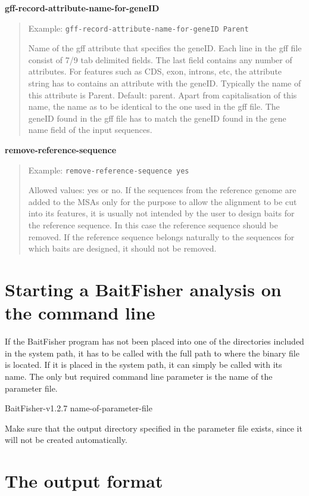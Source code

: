 \documentclass[a4paper,pdflatex,11pt]{article}
\begin{document}
\textbf{gff-record-attribute-name-for-geneID}

\begin{quote}
Example: \verb+gff-record-attribute-name-for-geneID Parent+

Name of the gff attribute that specifies the geneID. Each line in the
gff file consist of 7/9 tab delimited fields. The last field contains
any number of attributes. For features such as CDS, exon, introns, etc,
the attribute string has to contains an attribute with the geneID.
Typically the name of this attribute is Parent. Default: parent. Apart
from capitalisation of this name, the name as to be identical to the one
used in the gff file. The geneID found in the gff file has to match the
geneID found in the gene name field of the input sequences.
\end{quote}

\textbf{remove-reference-sequence}

\begin{quote}
Example: \verb+remove-reference-sequence yes+

Allowed values: yes or no. If the sequences from the reference genome
are added to the MSAs only for the purpose to allow the alignment to be
cut into its features, it is usually not intended by the user to design
baits for the reference sequence. In this case the reference sequence
should be removed. If the reference sequence belongs naturally to the
sequences for which baits are designed, it should not be removed.
\end{quote}

\section{Starting a BaitFisher analysis on the command line}


If the BaitFisher program has not been placed into one of the
directories included in the system path, it has to be called with the
full path to where the binary file is located. If it is placed in the
system path, it can simply be called with its name. The only but
required command line parameter is the name of the parameter file.

BaitFisher-v1.2.7 name-of-parameter-file

Make sure that the output directory specified in the parameter file
exists, since it will not be created automatically.

\section{The output format}
\end{document}
